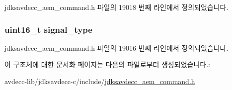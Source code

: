 jdksavdecc\+\_\+aem\+\_\+command.\+h 파일의 19018 번째 라인에서 정의되었습니다.

\subsubsection[{\texorpdfstring{signal\+\_\+type}{signal_type}}]{\setlength{\rightskip}{0pt plus 5cm}uint16\+\_\+t signal\+\_\+type}\hypertarget{structjdksavdecc__aem__command__set__signal__selector_a248e60ef99d5ed1779989d1dd6b6dc5a}{}\label{structjdksavdecc__aem__command__set__signal__selector_a248e60ef99d5ed1779989d1dd6b6dc5a}


jdksavdecc\+\_\+aem\+\_\+command.\+h 파일의 19016 번째 라인에서 정의되었습니다.



이 구조체에 대한 문서화 페이지는 다음의 파일로부터 생성되었습니다.\+:\begin{DoxyCompactItemize}
\item 
avdecc-\/lib/jdksavdecc-\/c/include/\hyperlink{jdksavdecc__aem__command_8h}{jdksavdecc\+\_\+aem\+\_\+command.\+h}\end{DoxyCompactItemize}
